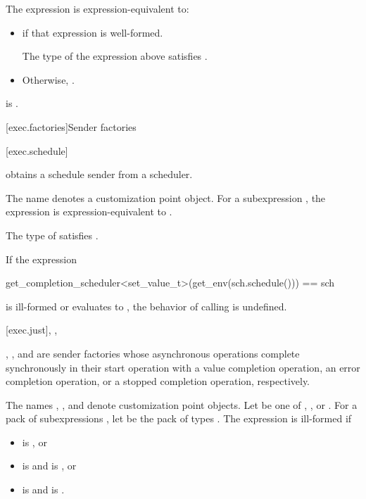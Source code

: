 \pnum
The expression  is expression-equivalent to:
\begin{itemize}
\item
{} if that expression is well-formed.

\mandates
The type of the expression above satisfies .

\item
Otherwise, .
\end{itemize}

\mandates
{} is .

[exec.factories]{Sender factories}

[exec.schedule]{}

\pnum
{} obtains a schedule sender
from a scheduler.

\pnum
The name  denotes a customization point object.
For a subexpression ,
the expression  is expression-equivalent to
.

\pnum
\mandates
The type of  satisfies .

\pnum
If the expression
\begin{codeblock}
get_completion_scheduler<set_value_t>(get_env(sch.schedule())) == sch
\end{codeblock}
is ill-formed or evaluates to ,
the behavior of calling  is undefined.

[exec.just]{, , }

\pnum
{}, , and  are sender factories
whose asynchronous operations complete synchronously in their start operation
with a value completion operation,
an error completion operation, or
a stopped completion operation, respectively.

\pnum
The names , , and  denote
customization point objects.
Let  be one of
, , or .
For a pack of subexpressions ,
let  be the pack of types .
The expression  is ill-formed if
\begin{itemize}
\item
{} is , or
\item
{} is  and
 is , or
\item
{} is  and
 is .
\end{itemize}

